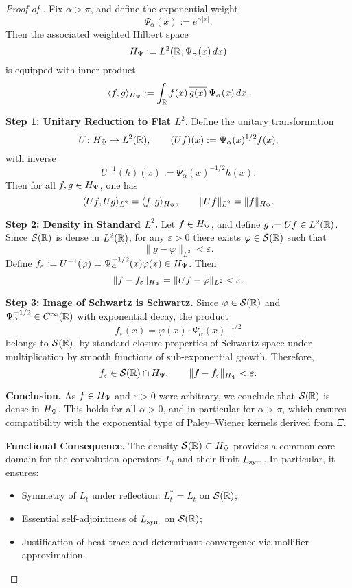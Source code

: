 \begin{proof}[Proof of ]
Fix \( \alpha > \pi \), and define the exponential weight
\[
\Psi_\alpha(x) := e^{\alpha |x|}.
\]
Then the associated weighted Hilbert space
\[
H_{\Psi} := L^2(\mathbb{R}, \Psi_\alpha(x)\,dx)
\]
is equipped with inner product
\[
\langle f, g \rangle_{H_{\Psi}} := \int_{\mathbb{R}} f(x)\, \overline{g(x)}\, \Psi_\alpha(x)\, dx.
\]

\medskip
\noindent\textbf{Step 1: Unitary Reduction to Flat \( L^2 \).}
Define the unitary transformation
\[
U \colon H_{\Psi} \to L^2(\mathbb{R}), \qquad (Uf)(x) := \Psi_\alpha(x)^{1/2} f(x),
\]
with inverse
\[
U^{-1}(h)(x) := \Psi_\alpha(x)^{-1/2} h(x).
\]
Then for all \( f, g \in H_{\Psi} \), one has
\[
\langle Uf, Ug \rangle_{L^2} = \langle f, g \rangle_{H_{\Psi}}, \qquad \|Uf\|_{L^2} = \|f\|_{H_{\Psi}}.
\]

\medskip
\noindent\textbf{Step 2: Density in Standard \( L^2 \).}
Let \( f \in H_{\Psi} \), and define \( g := Uf \in L^2(\mathbb{R}) \). Since \( \mathcal{S}(\mathbb{R}) \) is dense in \( L^2(\mathbb{R}) \), for any \( \varepsilon > 0 \) there exists \( \varphi \in \mathcal{S}(\mathbb{R}) \) such that
\[
\|g - \varphi\|_{L^2} < \varepsilon.
\]
Define \( f_\varepsilon := U^{-1}(\varphi) = \Psi_\alpha^{-1/2}(x) \varphi(x) \in H_{\Psi} \). Then
\[
\|f - f_\varepsilon\|_{H_{\Psi}} = \|Uf - \varphi\|_{L^2} < \varepsilon.
\]

\medskip
\noindent\textbf{Step 3: Image of Schwartz is Schwartz.}
Since \( \varphi \in \mathcal{S}(\mathbb{R}) \) and \( \Psi_\alpha^{-1/2} \in C^\infty(\mathbb{R}) \) with exponential decay, the product
\[
f_\varepsilon(x) = \varphi(x) \cdot \Psi_\alpha(x)^{-1/2}
\]
belongs to \( \mathcal{S}(\mathbb{R}) \), by standard closure properties of Schwartz space under multiplication by smooth functions of sub-exponential growth. Therefore,
\[
f_\varepsilon \in \mathcal{S}(\mathbb{R}) \cap H_{\Psi}, \qquad \|f - f_\varepsilon\|_{H_{\Psi}} < \varepsilon.
\]

\medskip
\noindent\textbf{Conclusion.}
As \( f \in H_{\Psi} \) and \( \varepsilon > 0 \) were arbitrary, we conclude that \( \mathcal{S}(\mathbb{R}) \) is dense in \( H_{\Psi} \). This holds for all \( \alpha > 0 \), and in particular for \( \alpha > \pi \), which ensures compatibility with the exponential type of Paley--Wiener kernels derived from \( \Xi \).

\medskip
\noindent\textbf{Functional Consequence.}
The density \( \mathcal{S}(\mathbb{R}) \subset H_{\Psi} \) provides a common core domain for the convolution operators \( L_t \) and their limit \( L_{\mathrm{sym}} \). In particular, it ensures:
\begin{itemize}
    \item Symmetry of \( L_t \) under reflection: \( L_t^* = L_t \) on \( \mathcal{S}(\mathbb{R}) \);
    \item Essential self-adjointness of \( L_{\mathrm{sym}} \) on \( \mathcal{S}(\mathbb{R}) \);
    \item Justification of heat trace and determinant convergence via mollifier approximation.
\end{itemize}
\end{proof}
